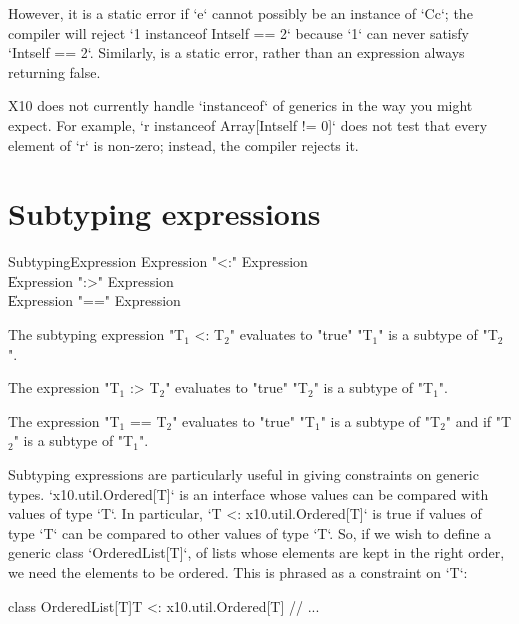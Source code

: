 However, it is a static error if \xcd`e` cannot possibly be an instance of
\xcd`C{c}`; the compiler will reject \xcd`1 instanceof Int{self == 2}` because
\xcd`1` can never satisfy \xcd`Int{self == 2}`. Similarly,  is a static error, rather than an expression always returning false. 

\limitationx
X10 does not currently handle \xcd`instanceof` of generics in the way you
might expect.  For example, \xcd`r instanceof Array[Int{self != 0}]` does
not test that every element of \xcd`r` is non-zero; instead, the compiler
rejects it.


\section{Subtyping expressions}

\begin{grammar}
SubtypingExpression \: Expression \xcd"<:" Expression \\
                    \| Expression \xcd":>" Expression \\
                    \| Expression \xcd"==" Expression \\
\end{grammar}

The subtyping expression \xcdmath"T$_1$ <: T$_2$" evaluates to \xcd"true"
\xcdmath"T$_1$" is a subtype of \xcdmath"T$_2$".

The expression \xcdmath"T$_1$ :> T$_2$" evaluates to \xcd"true"
\xcdmath"T$_2$" is a subtype of \xcdmath"T$_1$".

The expression \xcdmath"T$_1$ == T$_2$"
evaluates to  \xcd"true" \xcdmath"T$_1$" is a subtype of \xcdmath"T$_2$" and
if \xcdmath"T$_2$" is a subtype of \xcdmath"T$_1$".

Subtyping expressions are particularly useful in giving constraints on generic
types.  \xcd`x10.util.Ordered[T]` is an interface whose values can be compared
with values of type \xcd`T`. 
In particular, \xcd`T <: x10.util.Ordered[T]` is
true if values of type \xcd`T` can be compared to other values of type
\xcd`T`.  So, if we wish to define a generic class \xcd`OrderedList[T]`, of
lists whose elements are kept in the right order, we need the elements to be
ordered.  This is phrased as a constraint on \xcd`T`: 
\begin{xten}
class OrderedList[T]{T <: x10.util.Ordered[T]} {
  // ...
}
\end{xten}
%




